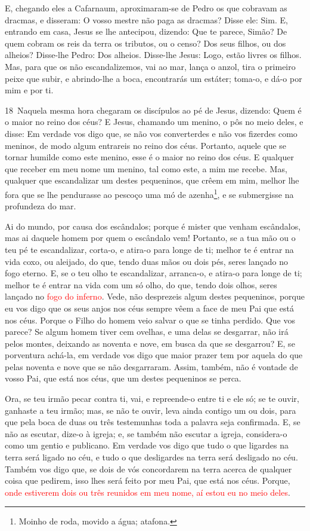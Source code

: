 E, chegando eles a Cafarnaum, aproximaram-se de Pedro os que
cobravam as dracmas, e disseram: O vosso mestre não paga as dracmas?
Disse ele: Sim. E, entrando em casa, Jesus se lhe antecipou,
dizendo: Que te parece, Simão? De quem cobram os reis da terra os
tributos, ou o censo? Dos seus filhos, ou dos alheios?
Disse-lhe Pedro: Dos alheios. Disse-lhe Jesus: Logo, estão
livres os filhos. Mas, para que os não escandalizemos, vai ao
mar, lança o anzol, tira o primeiro peixe que subir, e abrindo-lhe a
boca, encontrarás um estáter; toma-o, e dá-o por mim e por ti.

\medskip

\lettrine{18}\ Naquela mesma hora chegaram os discípulos ao pé
de Jesus, dizendo: Quem é o maior no reino dos céus? E Jesus,
chamando um menino, o pôs no meio deles, e disse: Em verdade vos
digo que, se não vos converterdes e não vos fizerdes como meninos,
de modo algum entrareis no reino dos céus. Portanto, aquele que
se tornar humilde como este menino, esse é o maior no reino dos
céus. E qualquer que receber em meu nome um menino, tal como
este, a mim me recebe. Mas, qualquer que escandalizar um destes
pequeninos, que crêem em mim, melhor lhe fora que se lhe pendurasse
ao pescoço uma mó de azenha\footnote{Moinho de roda, movido a água;
atafona.}, e se submergisse na profundeza do mar.

Ai do mundo, por causa dos escândalos; porque é mister que venham
escândalos, mas ai daquele homem por quem o escândalo vem!
Portanto, se a tua mão ou o teu pé te escandalizar, corta-o, e
atira-o para longe de ti; melhor te é entrar na vida coxo, ou
aleijado, do que, tendo duas mãos ou dois pés, seres lançado no fogo
eterno. E, se o teu olho te escandalizar, arranca-o, e atira-o
para longe de ti; melhor te é entrar na vida com um só olho, do que,
tendo dois olhos, seres lançado no \textcolor{red}{fogo do inferno}.
Vede, não desprezeis algum destes pequeninos, porque eu vos
digo que os seus anjos nos céus sempre vêem a face de meu Pai que
está nos céus. Porque o Filho do homem veio salvar o que se
tinha perdido. Que vos parece? Se algum homem tiver cem
ovelhas, e uma delas se desgarrar, não irá pelos montes, deixando as
noventa e nove, em busca da que se desgarrou? E, se
porventura achá-la, em verdade vos digo que maior prazer tem por
aquela do que pelas noventa e nove que se não desgarraram.
Assim, também, não é vontade de vosso Pai, que está nos céus,
que um destes pequeninos se perca.

Ora, se teu irmão pecar contra ti, vai, e repreende-o entre ti e
ele só; se te ouvir, ganhaste a teu irmão; mas, se não te
ouvir, leva ainda contigo um ou dois, para que pela boca de duas ou
três testemunhas toda a palavra seja confirmada. E, se não as
escutar, dize-o à igreja; e, se também não escutar a igreja,
considera-o como um gentio e publicano. Em verdade vos digo
que tudo o que ligardes na terra será ligado no céu, e tudo o que
desligardes na terra será desligado no céu. Também vos digo
que, se dois de vós concordarem na terra acerca de qualquer coisa
que pedirem, isso lhes será feito por meu Pai, que está nos céus.
Porque, \textcolor{red}{onde estiverem dois ou três reunidos em meu
nome, aí estou eu no meio deles}.

